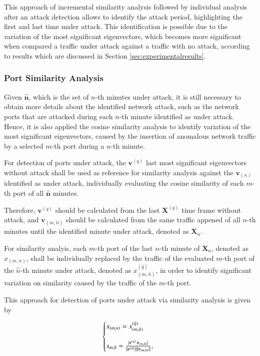 \documentclass[review]{elsarticle}
\DeclarePairedDelimiter\abs{\lvert}{\rvert}%
\DeclarePairedDelimiter\norm{\lVert}{\rVert}%
\begin{document}
This approach of incremental similarity analysis followed by individual analysis after an attack detection allows to identify the attack period, highlighting the first and last time under attack. This identification is possible due to the variation of the most significant eigenvectors, which becomes more significant when compared a traffic under attack against a traffic with no attack, according to results which are discussed in Section \ref{sec:experimentalresults}.

\subsubsection{Port Similarity Analysis}
\label{sec:prop_PortSimilarityAnalysis}

Given $\boldsymbol{\hat{n}}$, which is the set of $n$-th minutes under attack, it is still necessary to obtain more details about the identified network attack, such as the network ports that are attacked during each $n$-th minute identified as under attack. Hence, it is also applied the cosine similarity analysis to identify variation of the most significant eigenvectors, caused by the insertion of anomalous network traffic by a selected $m$-th port during a $n$-th minute. 

For detection of ports under attack, the $\boldsymbol{v}^{(q)}$ last most significant eigenvectors without attack shall be used as reference for similarity analysis against the $\boldsymbol{v}_{(n)}$ identified as under attack, individually evaluating the cosine similarity of each $m$-th port of all $\boldsymbol{\hat{n}}$ minutes.

Therefore, $\boldsymbol{v}^{(q)}$ should be calculated from the last $\boldsymbol{X}^{(q)}$ time frame without attack, and $\boldsymbol{v}_{(m,\hat{n})}$ should be calculated from the same traffic appened of all $n$-th minutes until the identified minute under attack, denoted as $\boldsymbol{X}_n$. 

For similarity analyis, each $m$-th port of the last $n$-th minute of $\boldsymbol{X}_n$, denoted as $x_{(m,n)}$, shall be individually replaced by the traffic of the evaluated $m$-th port of the $\hat{n}$-th minute under attack, denoted as $x^{(\hat{q})}_{(m,\hat{n})}$, in order to identify significant variation on similarity caused by the traffic of the $m$-th port. 

This approach for detection of ports under attack via similarity analysis is given by

\begin{equation}\label{eq:eq15}
  \left\{
  \begin{array}{@{}ll@{}}
    x_{(m,n)} = x^{(\hat{q})}_{(m,\hat{n})} \\
    \\
    s_{m,\hat{n}} = \frac{\abs{\boldsymbol{v}^{(q)} \cdot \boldsymbol{v}_{(m,\hat{n})}}}{\norm{\boldsymbol{v}^{(q)}}\norm{\boldsymbol{v}_{(m,\hat{n})}}},
  \end{array}\right.
\end{equation}
\end{document}
